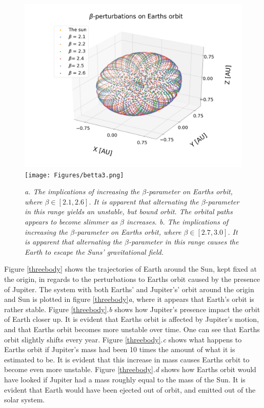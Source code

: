 \documentclass[%
reprint,nofootinbib,
amsmath,amssymb,
aps,
]{revtex4-1}
\begin{document}
\begin{figure}[H]
	\centering 
	\includegraphics[width = 0.45\columnwidth]{Figures/betta2.png}
	\texttt{[image: Figures/betta3.png]}
	\caption{\label{betta2} \textit{a. The implications of increasing the $\beta$-parameter on Earths orbit, where $\beta\in[2.1, 2.6]$. It is apparent that alternating the $\beta$-parameter in this range yields an unstable, but bound orbit. The orbital paths appears to become slimmer as $\beta$ increases. b. The implications of increasing the $\beta$-parameter on Earths orbit, where $\beta\in[2.7, 3.0]$. It is apparent that alternating the $\beta$-parameter in this range causes the Earth to escape the Suns' gravitational field. }}
	\vspace{10mm}
\end{figure} 

\twocolumngrid

\noindent Figure \ref{threebody} shows the trajectories of Earth around the Sun, kept fixed at the origin, in regards to the perturbations to Earths orbit caused by the presence of Jupiter. The system with both Earths' and Jupiter's' orbit around the origin and Sun is plotted in figure \ref{threebody}\textit{a}, where it appears that Earth's orbit is rather stable. Figure \ref{threebody}.\textit{b} shows how Jupiter's presence impact the orbit of Earth closer up. It is evident that Earths orbit is affected by Jupiter's motion, and that Earths orbit becomes more unstable over time. One can see that Earths orbit slightly shifts every year. Figure \ref{threebody}.\textit{c} shows what happens to Earths orbit if Jupiter's mass had been 10 times the amount of what it is estimated to be. It is evident that this increase in mass causes Earths orbit to become even more unstable. Figure \ref{threebody}.\textit{d} shows how Earths orbit would have looked if Jupiter had a mass roughly equal to the mass of the Sun. It is evident that Earth would have been ejected out of orbit, and emitted out of the solar system. \\ \indent

\onecolumngrid
\end{document}

